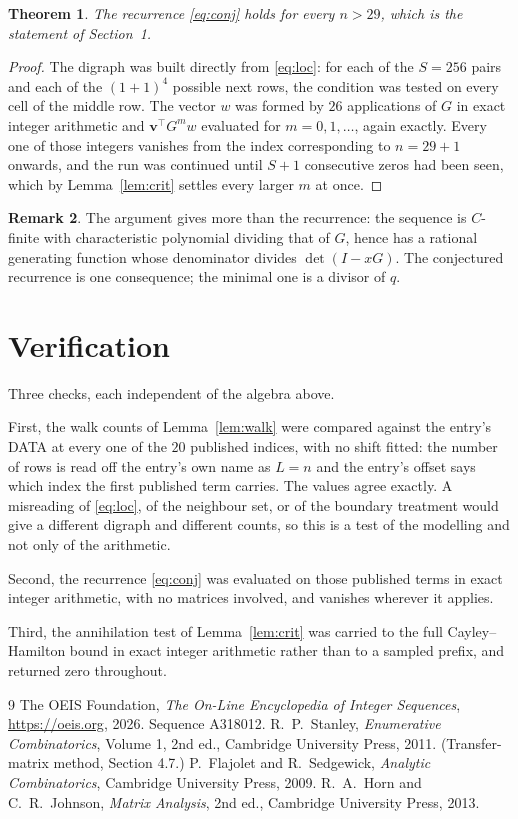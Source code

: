 \documentclass[11pt,a4paper]{article}
\theoremstyle{plain}
\newtheorem{theorem}{Theorem}
\theoremstyle{definition}
\newtheorem{remark}[theorem]{Remark}
\begin{document}
\begin{theorem}
The recurrence \eqref{eq:conj} holds for every $n>29$, which is the statement of
Section~1.
\end{theorem}

\begin{proof}
The digraph was built directly from \eqref{eq:loc}: for each of the $S=256$ pairs and each
of the $(1+1)^{4}$ possible next rows, the condition was tested on every cell of
the middle row. The vector $w$ was formed by $26$ applications of $G$ in exact integer
arithmetic and $\mathbf{v}^{\!\top}G^{m}w$ evaluated for $m=0,1,\dots$, again exactly.
Every one of those integers vanishes from the index corresponding to $n=29+1$ onwards,
and the run was continued until $S+1$ consecutive zeros had been seen, which by
Lemma~\ref{lem:crit} settles every larger $m$ at once.
\end{proof}

\begin{remark}
The argument gives more than the recurrence: the sequence is $C$-finite with characteristic
polynomial dividing that of $G$, hence has a rational generating function whose denominator
divides $\det(I-xG)$. The conjectured recurrence is one consequence; the minimal one is a
divisor of $q$.
\end{remark}

\section{Verification}

Three checks, each independent of the algebra above.

First, the walk counts of Lemma~\ref{lem:walk} were compared against the entry's DATA at
every one of the $20$ published indices, with no shift fitted: the number of rows is
read off the entry's own name as $L=n$ and the entry's offset says which index the first
published term carries. The values agree exactly. A misreading of \eqref{eq:loc}, of the
neighbour set, or of the boundary treatment would give a different digraph and different
counts, so this is a test of the modelling and not only of the arithmetic.

Second, the recurrence \eqref{eq:conj} was evaluated on those published terms in exact
integer arithmetic, with no matrices involved, and vanishes wherever it applies.

Third, the annihilation test of Lemma~\ref{lem:crit} was carried to the full
Cayley--Hamilton bound in exact integer arithmetic rather than to a sampled prefix, and
returned zero throughout.

\begin{thebibliography}{9}
 The OEIS Foundation, \emph{The On-Line Encyclopedia of Integer
Sequences}, \url{https://oeis.org}, 2026. Sequence A318012.
 R.~P.~Stanley, \emph{Enumerative Combinatorics}, Volume 1, 2nd ed.,
Cambridge University Press, 2011. (Transfer-matrix method, Section 4.7.)
 P.~Flajolet and R.~Sedgewick, \emph{Analytic Combinatorics}, Cambridge
University Press, 2009.
 R.~A.~Horn and C.~R.~Johnson, \emph{Matrix Analysis}, 2nd ed., Cambridge
University Press, 2013.
\end{thebibliography}
\end{document}
